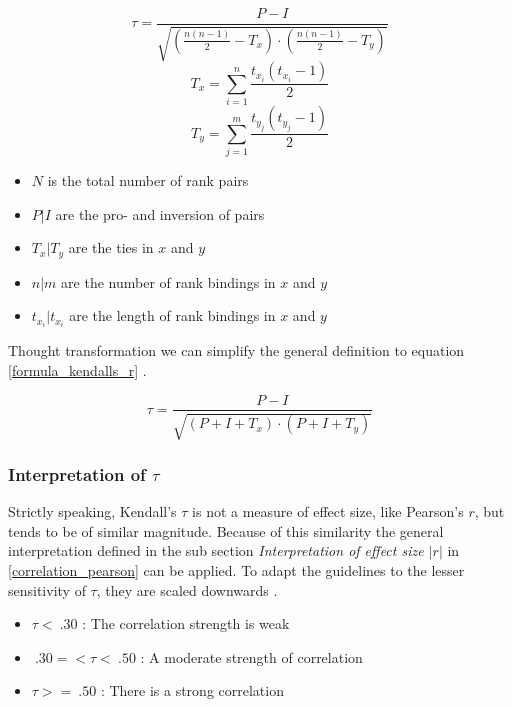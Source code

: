 \begin{equation}
\label{formula_kendalls_r_complex}
	\tau = \frac{P-I}{\sqrt{(\frac{n(n-1)}{2}-T_x) \cdot (\frac{n(n-1)}{2}-T_y)}}
\end{equation}
\begin{equation}
\label{formula_kendalls_r_tx}
	T_x = \sum_{i=1}^n \frac{t_{x_i}(t_{x_i}-1)}{2}
\end{equation}
\begin{equation}
\label{formula_kendalls_r_ty}
	T_y = \sum_{j=1}^m \frac{t_{y_j}(t_{y_j}-1)}{2}
\end{equation}
\smallskip

\begin{itemize}
	\setlength\itemsep{0.1em}	
	\item[] $N$ is the total number of rank pairs 
	\item[] $P | I$ are the pro- and inversion of pairs
	\item[] $T_x | T_y$ are the ties in $x$ and $y$
	\item[] $n | m$ are the number of rank bindings in $x$ and $y$
	\item[] $t_{x_i} | t_{x_i}$ are the length of rank bindings in $x$ and $y$
\end{itemize}

\bigskip

Thought transformation we can simplify the general definition to equation \ref{formula_kendalls_r} \parencite{Reiter2015}.

\begin{equation}
\label{formula_kendalls_r}
	\tau = \frac{P-I}{\sqrt{(P+I+T_x) \cdot (P+I+T_y)}}
\end{equation}

\subsubsection{Interpretation of $\tau$}
Strictly speaking, Kendall's $\tau$ is not a measure of effect size, like Pearson's $r$, but tends to be of similar magnitude. Because of this similarity the general interpretation defined in the sub section \textit{Interpretation of effect size $|r|$} in \cref{correlation_pearson} can be applied. To adapt the guidelines to the lesser sensitivity of $\tau$, they are scaled downwards \parencite{Regber2016}.

\begin{itemize}
	\item $\tau < \: .30$ : The correlation strength is weak
	\item $\: .30 =< \tau < \: .50$ : A moderate strength of correlation
	\item $\tau >= \: .50$ : There is a strong correlation
\end{itemize}


